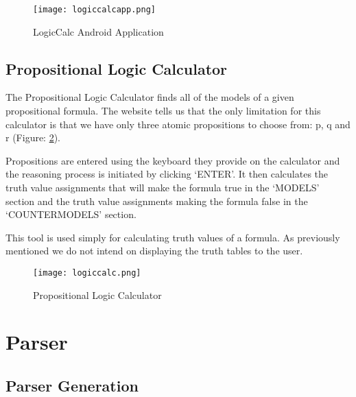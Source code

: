 \documentclass{report}
\begin{document}
\begin{figure}[ht!]
    \centering
    \texttt{[image: logiccalcapp.png]}
    \caption{LogicCalc Android Application}
    \label{logiccalcapp}
\end{figure}

\section{Propositional Logic Calculator}

The Propositional Logic Calculator\cite{logiccalc} finds all of the models of a given propositional formula. The website tells us that the only limitation for this calculator is that we have only three atomic propositions to choose from: p, q and r (Figure: \ref{logiccalc}).

Propositions are entered using the keyboard they provide on the calculator and the reasoning process is initiated by clicking `ENTER'. It then calculates the truth value assignments that will make the formula true in the `MODELS' section and the truth value assignments making the formula false in the `COUNTERMODELS' section.

This tool is used simply for calculating truth values of a formula. As previously mentioned we do not intend on displaying the truth tables to the user.

\begin{figure}[ht!]
    \centering
    \texttt{[image: logiccalc.png]}
    \caption{Propositional Logic Calculator}
    \label{logiccalc}
\end{figure}



\chapter{Parser}
\label{chap:parser}

\section{Parser Generation}
\end{document}
